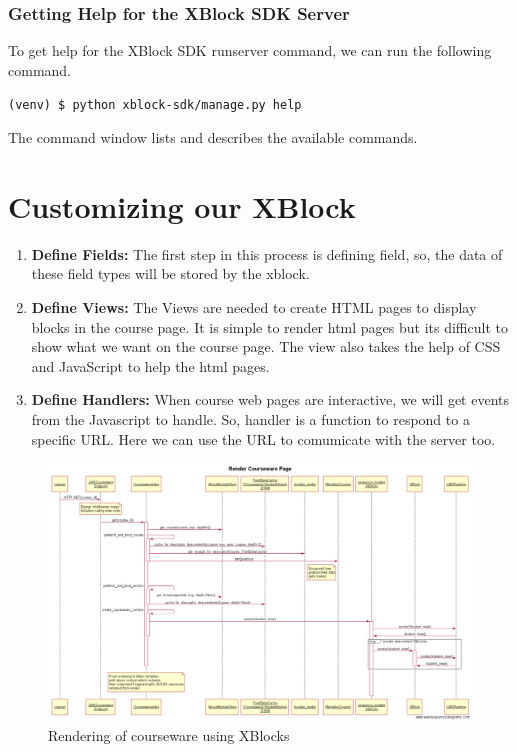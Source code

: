 \subsubsection{Getting Help for the XBlock SDK Server}
To get help for the XBlock SDK runserver command, we can run the following
command.
\begin{center}\verb=(venv) $ python xblock-sdk/manage.py help=\end{center}
The command window lists and describes the available commands.



\section{Customizing our XBlock}
\begin{enumerate}
\item \textbf{Define Fields:}\newline
The first step in this process is defining field, so, the data of these field types will be
stored by the xblock.
\item\textbf{ Define Views:}\newline
The Views are needed to create HTML pages to display blocks in the course page. It
is simple to render html pages but its difficult to show what we want on the course
page. The view also takes the help of CSS and JavaScript to help the html pages.
\item \textbf{Define Handlers:}\newline
When course web pages are interactive, we will get events from the Javascript to
handle. So, handler is a function to respond to a specific URL. Here we can use the
URL to comumicate with the server too.
\end{enumerate}



\begin{figure}[!]
	\includegraphics[width=\linewidth]{images/Render_Courseware_Page_Sequence_Diagram.png}
	\caption{Rendering of courseware using XBlocks}
	\label{Fig.1:Sequence diagram}
\end{figure}


